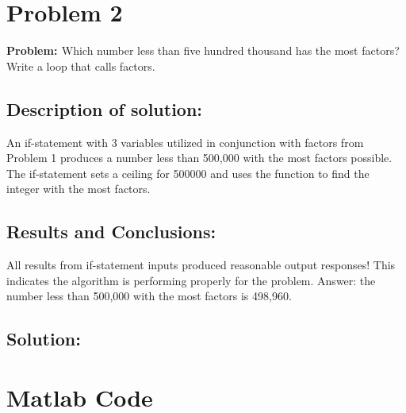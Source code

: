 \documentclass[12pt]{article} %
\begin{document}
\hfill
\newpage

\section {Problem 2}
{\bf{Problem: }}
Which number less than five hundred thousand has the most factors? Write a loop that calls factors.

\subsection{Description of solution:}
An if-statement with 3 variables utilized in conjunction with factors from Problem 1 produces a number less than 500,000 with the most factors possible.  The if-statement sets a ceiling for 500000 and uses the function to find the integer with the most factors.

\subsection{Results and Conclusions:}
All results from if-statement inputs produced reasonable output responses! This indicates the algorithm is performing properly for the problem.  
Answer: the number less than 500,000 with the most factors is 498,960.

\subsection{Solution:}



\section*{Matlab Code}


\end{document}
